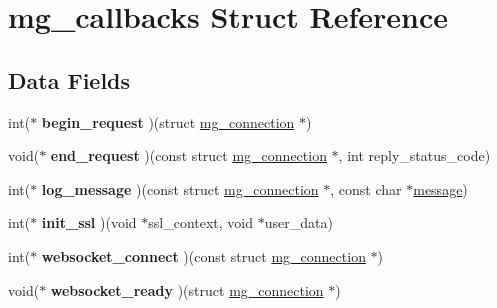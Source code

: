 \hypertarget{structmg__callbacks}{}\section{mg\+\_\+callbacks Struct Reference}
\label{structmg__callbacks}
\subsection*{Data Fields}
\begin{DoxyCompactItemize}
\item 
\mbox{\label{structmg__callbacks_aa9a778dfb6c14fdb615d9ef01cf5f6f2}} 
int($\ast$ {\bfseries begin\+\_\+request} )(struct \mbox{\hyperlink{structmg__connection}{mg\+\_\+connection}} $\ast$)
\item 
\mbox{\label{structmg__callbacks_a6c181367bf4fda47db688433d036654a}} 
void($\ast$ {\bfseries end\+\_\+request} )(const struct \mbox{\hyperlink{structmg__connection}{mg\+\_\+connection}} $\ast$, int reply\+\_\+status\+\_\+code)
\item 
\mbox{\label{structmg__callbacks_a2a24303cdd0175f9d8243402b268306e}} 
int($\ast$ {\bfseries log\+\_\+message} )(const struct \mbox{\hyperlink{structmg__connection}{mg\+\_\+connection}} $\ast$, const char $\ast$\mbox{\hyperlink{structmessage}{message}})
\item 
\mbox{\label{structmg__callbacks_a00fc9a6000bce32038693f6fde1ad9e3}} 
int($\ast$ {\bfseries init\+\_\+ssl} )(void $\ast$ssl\+\_\+context, void $\ast$user\+\_\+data)
\item 
\mbox{\label{structmg__callbacks_a45296219aecbd55a4897efd8bff94b64}} 
int($\ast$ {\bfseries websocket\+\_\+connect} )(const struct \mbox{\hyperlink{structmg__connection}{mg\+\_\+connection}} $\ast$)
\item 
\mbox{\label{structmg__callbacks_ac5f1f36b157f32e0db65b507d0578146}} 
void($\ast$ {\bfseries websocket\+\_\+ready} )(struct \mbox{\hyperlink{structmg__connection}{mg\+\_\+connection}} $\ast$)
\item 
\mbox{\label{structmg__callbacks_a66cf5ecd7093749eb02554fbe6b94c75}} 

\end{DoxyCompactItemize}
